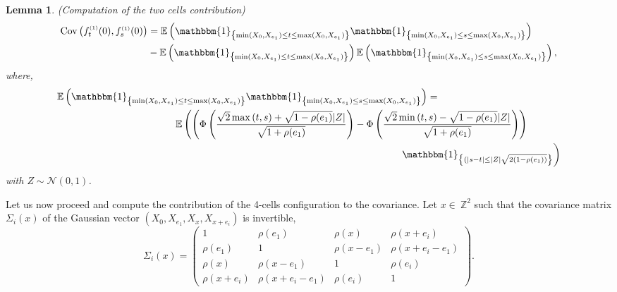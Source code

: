 \documentclass[12pt]{article}
\theoremstyle{Theorem}
\newtheorem{Lemma}[Theorem]{Lemma}
\theoremstyle{definition}
\begin{document}
\begin{Lemma}(Computation of the two cells contribution)
\begin{align*}
\text{Cov}\left(f_{t}^{\scriptscriptstyle (1)}(0), f_{s}^{\scriptscriptstyle (1)}(0)\right) & = \mathbb{E}\left(\mathbbm{1}_{\left\{\min(X_{\scriptscriptstyle 0}, X_{\scriptscriptstyle  e_1}) \leq t \leq \max(X_{\scriptscriptstyle 0}, X_{e_1})\right\}}\mathbbm{1}_{\left\{\min(X_{\scriptscriptstyle 0}, X_{ \scriptscriptstyle  e_1}) \leq s \leq \max(X_{\scriptscriptstyle 0}, X_{\scriptscriptstyle e_1}) \right\}}\right) \\
& - \mathbb{E}\left(\mathbbm{1}_{\left\{\min(X_{\scriptscriptstyle 0}, X_{e_1}) \leq t \leq \max(X_{\scriptscriptstyle 0}, X_{e_1})\right\}}\right)\mathbb{E}\left(\mathbbm{1}_{\left\{\min(X_{\scriptscriptstyle 0}, X_{e_1}) \leq s \leq \max(X_{\scriptscriptstyle 0}, X_{e_1})\right\}}\right),
\end{align*}
where, 
{\small
\begin{align*}
\mathbb{E}\left(\mathbbm{1}_{\left\{\min(X_{\scriptscriptstyle 0}, X_{\scriptscriptstyle  e_1}) \leq t \leq \max(X_{\scriptscriptstyle 0}, X_{e_1})\right\}}\mathbbm{1}_{\left\{\min(X_{\scriptscriptstyle 0}, X_{ \scriptscriptstyle  e_1}) \leq s \leq \max(X_{\scriptscriptstyle 0}, X_{\scriptscriptstyle e_1}) \right\}}\right) & = \\
& \hspace{-9cm}\mathbb{E}\left(\left(\Phi\left(\dfrac{\sqrt{2}\max\left(t,s\right) + \sqrt{1-\rho(e_1)}|Z|}{\sqrt{1+\rho(e_1)}}\right)  - \Phi\left(\dfrac{\sqrt{2}\min\left(t,s\right) - \sqrt{1-\rho(e_1)}|Z|}{\sqrt{1+\rho(e_1)}}\right)\right)\right. \\
& \hspace{-1cm} \left.\mathbbm{1}_{\left\{(|s-t| \leq |Z|\sqrt{2(1-\rho(e_1))}\right\}}\right)
\end{align*}}
with $Z \sim \mathcal{N}(0,1)$. 
\end{Lemma}
Let us now proceed and compute the contribution of the 4-cells configuration to the covariance.
Let $x \in~\mathbb{Z}^{2}$ such that the covariance matrix $\Sigma_{i}(x)$ of the Gaussian vector $\left(X_{\scriptscriptstyle 0}, X_{e_1}, X_{\scriptscriptstyle x}, X_{x+e_i}\right)$ is invertible, 
$$\Sigma_{i}(x) = \begin{pmatrix} 1 & \rho(e_1) & \rho(x) & \rho(x+e_i)\\
\rho(e_1) & 1 & \rho(x-e_1) &  \rho(x+e_i- e_1) \\ 
\rho(x) & \rho(x-e_1) & 1 & \rho(e_i) \\
\rho(x+e_i) & \rho(x+e_i-e_1) & \rho(e_i) & 1 \end{pmatrix}.$$
\end{document}
